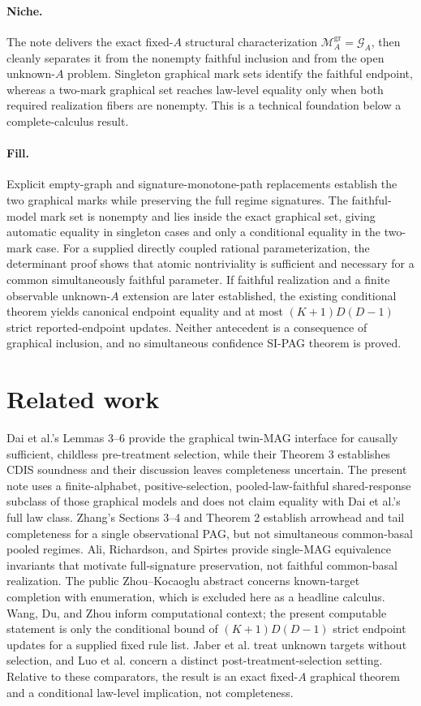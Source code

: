 \documentclass{article}
\begin{document}
\paragraph{Niche.} The note delivers the exact fixed-\(A\) structural characterization \(\mathcal M_A^{\mathrm{gr}}=\mathcal G_A\), then cleanly separates it from the nonempty faithful inclusion and from the open unknown-\(A\) problem. Singleton graphical mark sets identify the faithful endpoint, whereas a two-mark graphical set reaches law-level equality only when both required realization fibers are nonempty. This is a technical foundation below a complete-calculus result.

\paragraph{Fill.} Explicit empty-graph and signature-monotone-path replacements establish the two graphical marks while preserving the full regime signatures. The faithful-model mark set is nonempty and lies inside the exact graphical set, giving automatic equality in singleton cases and only a conditional equality in the two-mark case. For a supplied directly coupled rational parameterization, the determinant proof shows that atomic nontriviality is sufficient and necessary for a common simultaneously faithful parameter. If faithful realization and a finite observable unknown-\(A\) extension are later established, the existing conditional theorem yields canonical endpoint equality and at most \((K+1)D(D-1)\) strict reported-endpoint updates. Neither antecedent is a consequence of graphical inclusion, and no simultaneous confidence SI-PAG theorem is proved.

\section{Related work}

Dai et al.'s Lemmas 3--6 provide the graphical twin-MAG interface for causally sufficient, childless pre-treatment selection, while their Theorem 3 establishes CDIS soundness and their discussion leaves completeness uncertain. The present note uses a finite-alphabet, positive-selection, pooled-law-faithful shared-response subclass of those graphical models and does not claim equality with Dai et al.'s full law class. Zhang's Sections 3--4 and Theorem 2 establish arrowhead and tail completeness for a single observational PAG, but not simultaneous common-basal pooled regimes. Ali, Richardson, and Spirtes provide single-MAG equivalence invariants that motivate full-signature preservation, not faithful common-basal realization. The public Zhou--Kocaoglu abstract concerns known-target completion with enumeration, which is excluded here as a headline calculus. Wang, Du, and Zhou inform computational context; the present computable statement is only the conditional bound of \((K+1)D(D-1)\) strict endpoint updates for a supplied fixed rule list. Jaber et al. treat unknown targets without selection, and Luo et al. concern a distinct post-treatment-selection setting. Relative to these comparators, the result is an exact fixed-\(A\) graphical theorem and a conditional law-level implication, not completeness.
\end{document}
